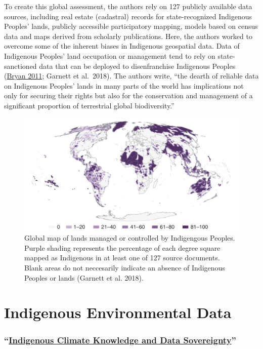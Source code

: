 \documentclass[
]{book}
\begin{document}
To create this global assessment, the authors rely on 127 publicly available data sources, including real estate (cadastral) records for state-recognized Indigenous Peoples' lands, publicly accessible participatory mapping, models based on census data and maps derived from scholarly publications. Here, the authors worked to overcome some of the inherent biases in Indigenous geospatial data. Data of Indigenous Peoples' land occupation or management tend to rely on state-sanctioned data that can be deployed to disenfranchise Indigenous Peoples (\href{https://www.sciencedirect.com/science/article/pii/S0016718510001090?via\%3Dihub}{Bryan 2011}; Garnett et al.~2018). The authors write, ``the dearth of reliable data on Indigenous Peoples' lands in many parts of the world has implications not only for securing their rights but also for the conservation and management of a significant proportion of terrestrial global biodiversity.''

\begin{figure}
\includegraphics[width=30.92in]{images/Garnett_2018} \caption{Global map of lands managed or controlled by Indigengous Peoples. Purple shading represents the percentage of each degree square mapped as Indigenous in at least one of 127 source documents. Blank areas do not neccesarily indicate an absence of Indigenous Peoples or lands (Garnett et al. 2018).}\label{fig:unnamed-chunk-9}
\end{figure}

\hypertarget{indigenous-environmental-data}{%
\section{Indigenous Environmental Data}\label{indigenous-environmental-data}}

\hypertarget{indigenous-climate-knowledge-and-data-sovereignty}{%
\subsubsection*{\texorpdfstring{``\href{https://open.spotify.com/episode/4Gdp1RSChCPM0qftRun3DD?si=pcVeYiwwQIWnlKynt4-ADQ}{Indigenous Climate Knowledge and Data Sovereignty}''}{``Indigenous Climate Knowledge and Data Sovereignty''}}\label{indigenous-climate-knowledge-and-data-sovereignty}}
\end{document}
